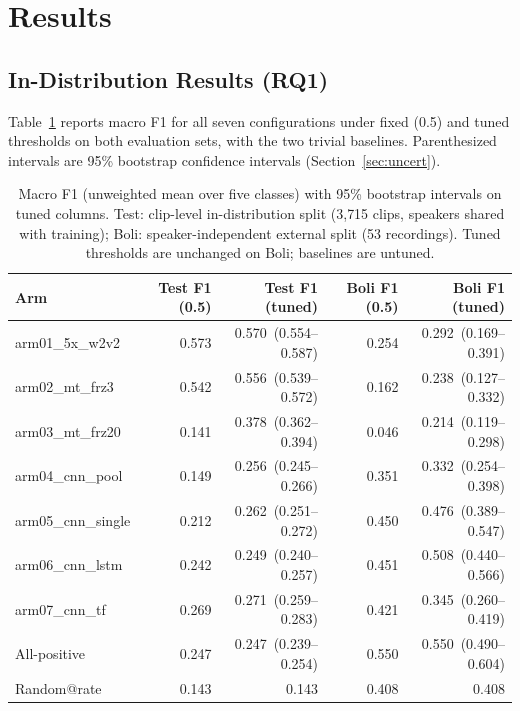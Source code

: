 \documentclass[a4paper,orivec]{llncs}
\newcommand{\ci}[1]{{\scriptsize\,(#1)}}
\begin{document}
\section{Results}
\label{sec:results}

\subsection{In-Distribution Results (RQ1)}
\label{sec:res-indist}
Table~\ref{tab:macro} reports macro F1 for all seven configurations under fixed
(0.5) and tuned thresholds on both evaluation sets, with the two trivial
baselines. Parenthesized intervals are 95\% bootstrap confidence intervals
(Section~\ref{sec:uncert}).
\begin{table}[!htbp]
\caption{Macro F1 (unweighted mean over five classes) with 95\% bootstrap
intervals on tuned columns. Test: clip-level in-distribution split (3{,}715
clips, speakers shared with training); Boli: speaker-independent external split
(53 recordings). Tuned thresholds are unchanged on Boli; baselines are untuned.}
\label{tab:macro}
\centering
\footnotesize
\setlength{\tabcolsep}{2pt}
\renewcommand{\arraystretch}{0.9}
\begin{tabular}{lrrrr}
\hline
Arm & Test F1 (0.5) & Test F1 (tuned) & Boli F1 (0.5) & Boli F1 (tuned)\\
\hline
arm01\_5x\_w2v2 & 0.573 & 0.570 \ci{0.554--0.587} & 0.254 & 0.292 \ci{0.169--0.391}\\
arm02\_mt\_frz3 & 0.542 & 0.556 \ci{0.539--0.572} & 0.162 & 0.238 \ci{0.127--0.332}\\
arm03\_mt\_frz20 & 0.141 & 0.378 \ci{0.362--0.394} & 0.046 & 0.214 \ci{0.119--0.298}\\
arm04\_cnn\_pool & 0.149 & 0.256 \ci{0.245--0.266} & 0.351 & 0.332 \ci{0.254--0.398}\\
arm05\_cnn\_single & 0.212 & 0.262 \ci{0.251--0.272} & 0.450 & 0.476 \ci{0.389--0.547}\\
arm06\_cnn\_lstm & 0.242 & 0.249 \ci{0.240--0.257} & 0.451 & 0.508 \ci{0.440--0.566}\\
arm07\_cnn\_tf & 0.269 & 0.271 \ci{0.259--0.283} & 0.421 & 0.345 \ci{0.260--0.419}\\
\hline
All-positive & 0.247 & 0.247 \ci{0.239--0.254} & 0.550 & 0.550 \ci{0.490--0.604}\\
Random@rate & 0.143 & 0.143 & 0.408 & 0.408\\
\hline
\end{tabular}
\end{table}
\end{document}
